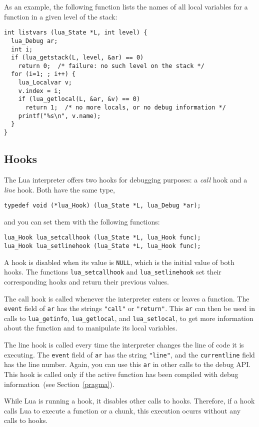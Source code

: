 \documentclass[11pt]{article}
\newcommand{\See}[1]{Section~\ref{#1}}
\newcommand{\see}[1]{(see \See{#1})}
\newcommand{\Deffunc}[1]{\index{#1}}
\begin{document}
As an example, the following function lists the names of all
local variables for a function in a given level of the stack:
\begin{verbatim}
int listvars (lua_State *L, int level) {
  lua_Debug ar;
  int i;
  if (lua_getstack(L, level, &ar) == 0)
    return 0;  /* failure: no such level on the stack */
  for (i=1; ; i++) {
    lua_Localvar v;
    v.index = i;
    if (lua_getlocal(L, &ar, &v) == 0)
      return 1;  /* no more locals, or no debug information */
    printf("%s\n", v.name);
  }
}
\end{verbatim}


\subsection{Hooks}\label{sub-hooks}

The Lua interpreter offers two hooks for debugging purposes:
a \emph{call} hook and a \emph{line} hook.
Both have the same type,
\begin{verbatim}
typedef void (*lua_Hook) (lua_State *L, lua_Debug *ar);
\end{verbatim}
and you can set them with the following functions:
\Deffunc{lua_Hook}\Deffunc{lua_setcallhook}\Deffunc{lua_setlinehook}
\begin{verbatim}
lua_Hook lua_setcallhook (lua_State *L, lua_Hook func);
lua_Hook lua_setlinehook (lua_State *L, lua_Hook func);
\end{verbatim}
A hook is disabled when its value is \verb|NULL|,
which is the initial value of both hooks.
The functions \verb|lua_setcallhook| and \verb|lua_setlinehook|
set their corresponding hooks and return their previous values.

The call hook is called whenever the
interpreter enters or leaves a function.
The \verb|event| field of \verb|ar| has the strings \verb|"call"|
or \verb|"return"|.
This \verb|ar| can then be used in calls to \verb|lua_getinfo|,
\verb|lua_getlocal|, and \verb|lua_setlocal|,
to get more information about the function and to manipulate its
local variables.

The line hook is called every time the interpreter changes
the line of code it is executing.
The \verb|event| field of \verb|ar| has the string \verb|"line"|,
and the \verb|currentline| field has the line number.
Again, you can use this \verb|ar| in other calls to the debug API.
This hook is called only if the active function
has been compiled with debug information~\see{pragma}.

While Lua is running a hook, it disables other calls to hooks.
Therefore, if a hook calls Lua to execute a function or a chunk,
this execution ocurrs without any calls to hooks.
\end{document}
